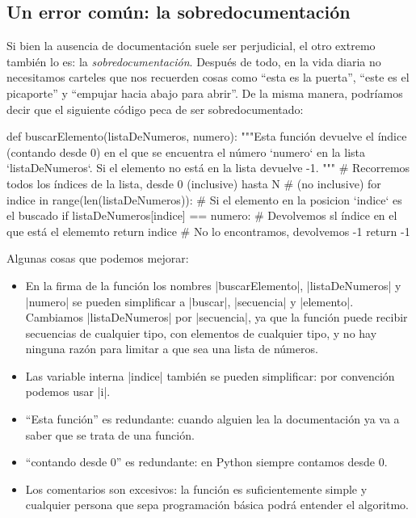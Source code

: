 \subsection{Un error común: la sobredocumentación}

Si bien la ausencia de documentación suele ser perjudicial, el otro extremo
también lo es: la \emph{sobredocumentación}. Después de todo, en la vida
diaria no necesitamos carteles que nos recuerden cosas como ``esta es la
puerta'', ``este es el picaporte'' y ``empujar hacia abajo para abrir''. De
la misma manera, podríamos decir que el siguiente código peca de ser sobredocumentado:

\begin{codigo-python-sn}
def buscarElemento(listaDeNumeros, numero):
    """Esta función devuelve el índice (contando desde 0) en el que se
       encuentra el número `numero` en la lista `listaDeNumeros`. Si el elemento
       no está en la lista devuelve -1.
    """
    # Recorremos todos los índices de la lista, desde 0 (inclusive) hasta N
    # (no inclusive)
    for indice in range(len(listaDeNumeros)):
        # Si el elemento en la posicion `indice` es el buscado
        if listaDeNumeros[indice] == numero:
            # Devolvemos sl índice en el que está el elememto
            return indice
    # No lo encontramos, devolvemos -1
    return -1
\end{codigo-python-sn}

Algunas cosas que podemos mejorar:

\begin{itemize}
\item En la firma de la función los nombres |buscarElemento|,
    |listaDeNumeros| y |numero| se pueden simplificar a |buscar|, |secuencia| y
    |elemento|. Cambiamos |listaDeNumeros| por |secuencia|, ya que la función
    puede recibir secuencias de cualquier tipo, con elementos de cualquier
    tipo, y no hay ninguna razón para limitar a que sea una lista de números.
\item Las variable interna |indice| también se pueden simplificar:
    por convención podemos usar |i|.
\item ``Esta función'' es redundante: cuando alguien lea la documentación ya va
    a saber que se trata de una función.
\item ``contando desde 0'' es redundante: en Python siempre contamos desde 0.
\item Los comentarios son excesivos: la función es suficientemente simple y
    cualquier persona que sepa programación básica podrá entender el algoritmo.
\end{itemize}

